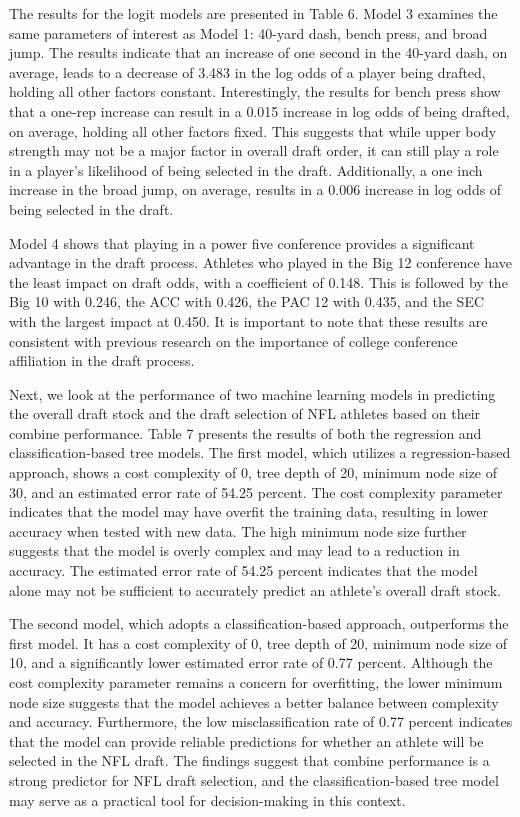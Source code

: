 \documentclass[12pt,english]{article}
\begin{document}
The results for the logit models are presented in Table 6. Model 3 examines the same parameters of interest as Model 1: 40-yard dash, bench press, and broad jump. The results indicate that an increase of one second in the 40-yard dash, on average, leads to a decrease of 3.483 in the log odds of a player being drafted, holding all other factors constant. Interestingly, the results for bench press show that a one-rep increase can result in a 0.015 increase in log odds of being drafted, on average, holding all other factors fixed. This suggests that while upper body strength may not be a major factor in overall draft order, it can still play a role in a player's likelihood of being selected in the draft. Additionally, a one inch increase in the broad jump, on average, results in a 0.006 increase in log odds of being selected in the draft.

Model 4 shows that playing in a power five conference provides a significant advantage in the draft process. Athletes who played in the Big 12 conference have the least impact on draft odds, with a coefficient of 0.148. This is followed by the Big 10 with 0.246, the ACC with 0.426, the PAC 12 with 0.435, and the SEC with the largest impact at 0.450. It is important to note that these results are consistent with previous research on the importance of college conference affiliation in the draft process.

Next, we look at the performance of two machine learning models in predicting the overall draft stock and the draft selection of NFL athletes based on their combine performance. Table 7 presents the results of both the regression and classification-based tree models. The first model, which utilizes a regression-based approach, shows a cost complexity of 0, tree depth of 20, minimum node size of 30, and an estimated error rate of 54.25 percent. The cost complexity parameter indicates that the model may have overfit the training data, resulting in lower accuracy when tested with new data. The high minimum node size further suggests that the model is overly complex and may lead to a reduction in accuracy. The estimated error rate of 54.25 percent indicates that the model alone may not be sufficient to accurately predict an athlete's overall draft stock.

The second model, which adopts a classification-based approach, outperforms the first model. It has a cost complexity of 0, tree depth of 20, minimum node size of 10, and a significantly lower estimated error rate of 0.77 percent. Although the cost complexity parameter remains a concern for overfitting, the lower minimum node size suggests that the model achieves a better balance between complexity and accuracy. Furthermore, the low misclassification rate of 0.77 percent indicates that the model can provide reliable predictions for whether an athlete will be selected in the NFL draft. The findings suggest that combine performance is a strong predictor for NFL draft selection, and the classification-based tree model may serve as a practical tool for decision-making in this context.
\end{document}
